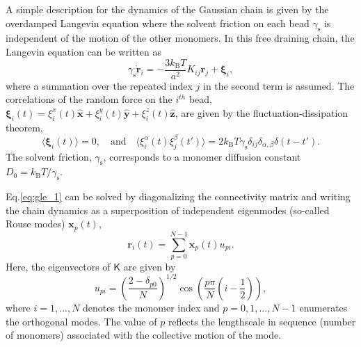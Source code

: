 \documentclass[../talant.diss.submit.tex]{subfiles}
\begin{document}
A simple description for the dynamics of the Gaussian chain is given by the
overdamped Langevin equation where the solvent friction on each bead  $\gamma_\mathrm{s}$
is independent of the motion of the other monomers. In this free draining chain,
the Langevin equation can be written as
\begin{equation}
  \label{eq:gle_1}
  \gamma_\mathrm{s} \dot{\bm{r}}_i = - \frac{3 k_\mathrm{B}T}{a^2} K_{ij}\bm{r}_j + \bm{\xi}_i,
\end{equation}
where a summation over the repeated index $j$ in the second term is assumed.
The correlations of the random force on the $i^{th}$ bead,
$\bm{\xi}_i(t) = \xi_i^x(t) \bm{\hat{x}} + \xi_i^y(t) \bm{\hat{y}} +\xi_i^z(t) \bm{\hat{z}}$,
are given by the fluctuation-dissipation theorem,
\begin{equation}
  \label{eq:random_force} 
  \langle \bm{\xi}_i(t)\rangle = 0, \quad \mbox{and}
  \quad \langle \xi_i^\alpha(t) \xi_j^\beta(t') \rangle = 2 k_\mathrm{B} T \gamma_\mathrm{s} \delta_{ij}\delta_{\alpha,\beta} \delta(t-t').
\end{equation}
The solvent friction, $\gamma_\mathrm{s}$, corresponds to a monomer diffusion constant $D_0 = k_\mathrm{B}T/\gamma_\mathrm{s}$.
  
%

Eq.\ref{eq:gle_1} can be solved by diagonalizing the connectivity matrix and writing the chain dynamics 
as a superposition of independent eigenmodes (so-called Rouse modes) $\bm{x}_p(t)$,
%
\begin{equation}
  \label{eq:lin_trans}
  \bm{r}_i(t) = \sum_{p=0}^{N-1} \bm{x}_p(t) u_{pi}.
\end{equation}
%
Here, the eigenvectors of $\bm{\mathsf{K}}$ are given by
%
\begin{equation}
  \label{eq:modes_p}
  u_{pi} = \left(\frac{2-\delta_{p0}}{N} \right)^{1/2}
  \cos \left( \frac{p\pi }{N}\left(i-\frac{1}{2}\right)  \right),
\end{equation}
where $i = 1, . . . , N$ denotes the monomer index and $p = 0, 1,. . . , N-1$
enumerates the orthogonal modes. The value of $p$ reflects the lengthscale in
sequence (number of monomers) associated with the collective motion of the mode.
\end{document}
